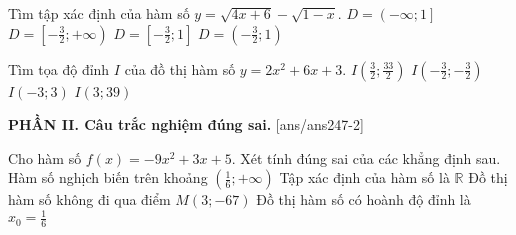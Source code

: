 \documentclass[12pt,a4paper]{article}
\begin{document}
\begin{ex}
 Tìm tập xác định của hàm số $y=\sqrt{4 x + 6} - \sqrt{1 - x}$.
\choice
{ ${D=\left(-\infty;1\right]}$ }
   { ${D=\left[- \frac{3}{2} ;+\infty\right)}$ }
     { \True ${D=\left[- \frac{3}{2} ;1 \right]}$ }
    { ${D=\left(- \frac{3}{2} ;1 \right)}$ }
\end{ex}

\begin{ex}
 Tìm tọa độ đỉnh ${I}$ của đồ thị hàm số $y=2 x^{2} + 6 x + 3$.
\choice
{ ${I\left(\frac{3}{2};\frac{33}{2}\right)}$ }
   { \True ${I\left(- \frac{3}{2};- \frac{3}{2}\right)}$ }
     { ${I\left(-3;3\right)}$ }
    { ${I\left(3;39\right)}$ }
\end{ex}

{\bf PHẦN II. Câu trắc nghiệm đúng sai.}
\setcounter{ex}{0}
[ans/ans247-2]
\begin{ex}
 Cho hàm số $f(x)=- 9 x^{2} + 3 x + 5$. Xét tính đúng sai của các khẳng định sau.
\choiceTF
{ \True Hàm số nghịch biến trên khoảng $\displaystyle \left(\frac{1}{6};+\infty \right)$ }
   { \True Tập xác định của hàm số là $\mathbb{R}$ }
     { Đồ thị hàm số không đi qua điểm $M(3;-67)$ }
    { \True Đồ thị hàm số có hoành độ đỉnh là $\displaystyle x_0=\frac{1}{6}$ }
\end{ex}
\end{document}
